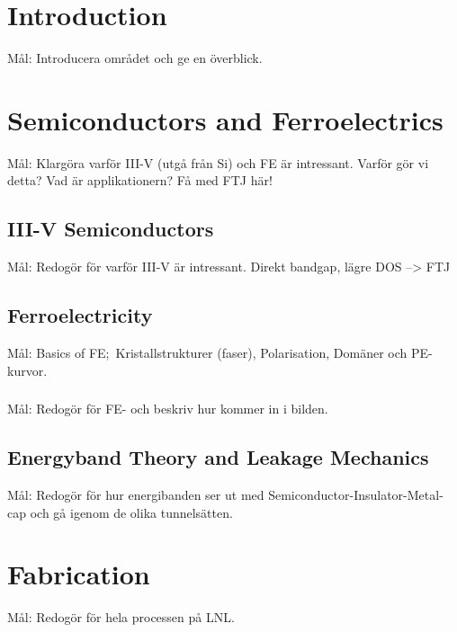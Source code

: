 \documentclass[11pt]{article}
\begin{document}
    \section{Introduction}

    Mål: Introducera området och ge en överblick.\cite{atle2019development}

    \section{Semiconductors and Ferroelectrics}

    Mål: Klargöra varför III-V (utgå från Si) och FE är intressant. Varför gör vi detta? Vad är applikationern? Få med FTJ här!

        \subsection{III-V Semiconductors}

        Mål: Redogör för varför III-V är intressant. Direkt bandgap, lägre DOS --> FTJ

        \subsection{Ferroelectricity}

        Mål: Basics of FE;\ Kristallstrukturer (faser), Polarisation, Domäner och PE-kurvor.

            \subsubsection{}

            Mål: Redogör för FE- och beskriv hur  kommer in i bilden.

        \subsection{Energyband Theory and Leakage Mechanics}

        Mål: Redogör för hur energibanden ser ut med Semiconductor-Insulator-Metal-cap och gå igenom de olika tunnelsätten.

    \section{Fabrication}

    Mål: Redogör för hela processen på LNL.\ 
\end{document}
